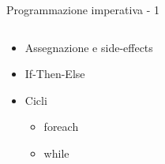 \begin{frame}{Programmazione imperativa - 1}

	\begin{columns}
		\begin{column}{0.5\textwidth}
			\begin{itemize}
				\item Assegnazione e side-effects
				\item If-Then-Else
				\item Cicli
				\begin{itemize}
					\item foreach
					\item while
				\end{itemize}
			\end{itemize}
		\end{column}

		\begin{column}{0.5\textwidth}
			

\end{column}
\end{columns}
\end{frame}
